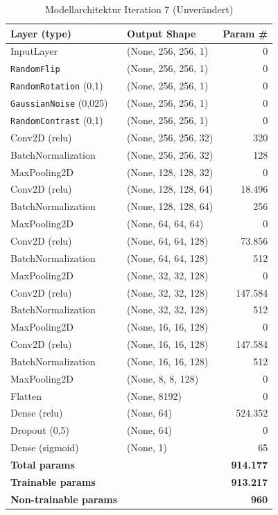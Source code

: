 \documentclass[
    a4paper,        %
    11pt,           %
    ngerman,        %
    parskip=half,   %
    listof=totoc,   %
    bibliography=totoc %
]{scrartcl}
\begin{document}
\begin{table}[H]
    \centering
    \caption{Modellarchitektur Iteration 7 (Unverändert)}
    \label{tab:model_summary_iter7}
    \begin{tabular}{llr}
        \toprule
        \textbf{Layer (type)} & \textbf{Output Shape} & \textbf{Param \#} \\
        \midrule
        InputLayer & (None, 256, 256, 1) & 0 \\
        \texttt{RandomFlip} & (None, 256, 256, 1) & 0 \\
        \texttt{RandomRotation} (0,1) & (None, 256, 256, 1) & 0 \\
        \texttt{GaussianNoise} (0,025) & (None, 256, 256, 1) & 0 \\
        \texttt{RandomContrast} (0,1) & (None, 256, 256, 1) & 0 \\
        Conv2D (relu) & (None, 256, 256, 32) & 320 \\
        BatchNormalization & (None, 256, 256, 32) & 128 \\
        MaxPooling2D & (None, 128, 128, 32) & 0 \\
        Conv2D (relu) & (None, 128, 128, 64) & 18.496 \\
        BatchNormalization & (None, 128, 128, 64) & 256 \\
        MaxPooling2D & (None, 64, 64, 64) & 0 \\
        Conv2D (relu) & (None, 64, 64, 128) & 73.856 \\
        BatchNormalization & (None, 64, 64, 128) & 512 \\
        MaxPooling2D & (None, 32, 32, 128) & 0 \\
        Conv2D (relu) & (None, 32, 32, 128) & 147.584 \\
        BatchNormalization & (None, 32, 32, 128) & 512 \\
        MaxPooling2D & (None, 16, 16, 128) & 0 \\
        Conv2D (relu) & (None, 16, 16, 128) & 147.584 \\
        BatchNormalization & (None, 16, 16, 128) & 512 \\
        MaxPooling2D & (None, 8, 8, 128) & 0 \\
        Flatten & (None, 8192) & 0 \\
        Dense (relu) & (None, 64) & 524.352 \\
        Dropout (0,5) & (None, 64) & 0 \\
        Dense (sigmoid) & (None, 1) & 65 \\
        \midrule
        \textbf{Total params} & & \textbf{914.177} \\
        \textbf{Trainable params} & & \textbf{913.217} \\
        \textbf{Non-trainable params} & & \textbf{960} \\
        \bottomrule
    \end{tabular}
\end{table}
\end{document}
